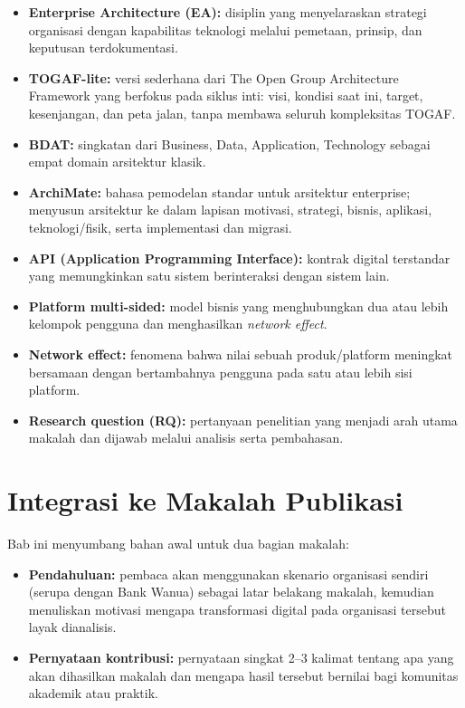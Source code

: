\begin{itemize}
  \item \textbf{Enterprise Architecture (EA):} disiplin yang menyelaraskan
        strategi organisasi dengan kapabilitas teknologi melalui pemetaan,
        prinsip, dan keputusan terdokumentasi.
  \item \textbf{TOGAF-lite:} versi sederhana dari The Open Group Architecture
        Framework yang berfokus pada siklus inti: visi, kondisi saat ini,
        target, kesenjangan, dan peta jalan, tanpa membawa seluruh
        kompleksitas TOGAF.
  \item \textbf{BDAT:} singkatan dari Business, Data, Application, Technology
        sebagai empat domain arsitektur klasik.
  \item \textbf{ArchiMate:} bahasa pemodelan standar untuk arsitektur
        enterprise; menyusun arsitektur ke dalam lapisan motivasi, strategi,
        bisnis, aplikasi, teknologi/fisik, serta implementasi dan migrasi.
  \item \textbf{API (Application Programming Interface):} kontrak digital
        terstandar yang memungkinkan satu sistem berinteraksi dengan sistem
        lain.
  \item \textbf{Platform multi-sided:} model bisnis yang menghubungkan dua atau
        lebih kelompok pengguna dan menghasilkan \emph{network effect}.
  \item \textbf{Network effect:} fenomena bahwa nilai sebuah produk/platform
        meningkat bersamaan dengan bertambahnya pengguna pada satu atau lebih
        sisi platform.
  \item \textbf{Research question (RQ):} pertanyaan penelitian yang menjadi
        arah utama makalah dan dijawab melalui analisis serta pembahasan.
\end{itemize}

\section{Integrasi ke Makalah Publikasi}

Bab ini menyumbang bahan awal untuk dua bagian makalah:

\begin{itemize}
  \item \textbf{Pendahuluan:} pembaca akan menggunakan skenario organisasi
        sendiri (serupa dengan Bank Wanua) sebagai latar belakang makalah,
        kemudian
        menuliskan motivasi mengapa transformasi digital pada organisasi
        tersebut layak dianalisis.
  \item \textbf{Pernyataan kontribusi:} pernyataan singkat 2--3 kalimat
        tentang apa yang akan dihasilkan makalah dan mengapa hasil tersebut
        bernilai bagi komunitas akademik atau praktik.
\end{itemize}

